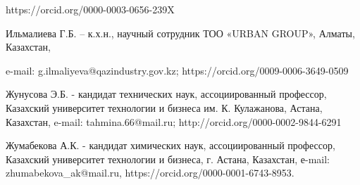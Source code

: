 \begin{authorinfo}
https://orcid.org/0000-0003-0656-239X

Ильмалиева Г.Б. -- к.х.н., научный сотрудник ТОО «URBAN GROUP», Алматы,
Казахстан,

e-mail:
g.ilmaliyeva@qazindustry.gov.kz;
https://orcid.org/0009-0006-3649-0509

Жунусова Э.Б. - кандидат технических наук, ассоциированный профессор,
Казахский университет технологии и бизнеса им. К. Кулажанова, Астана,
Казахстан, e-mail:
tahmina.66@mail.ru;
http://orcid.org/0000-0002-9844-6291

Жумабекова А.К. - кандидат химических наук, ассоциированный профессор,
Казахский университет технологии и бизнеса, г. Астана, Казахстан,
е-mail:
zhumabekova\_ak@mail.ru,
https://orcid.org/0000-0001-6743-8953.\
\end{authorinfo}
